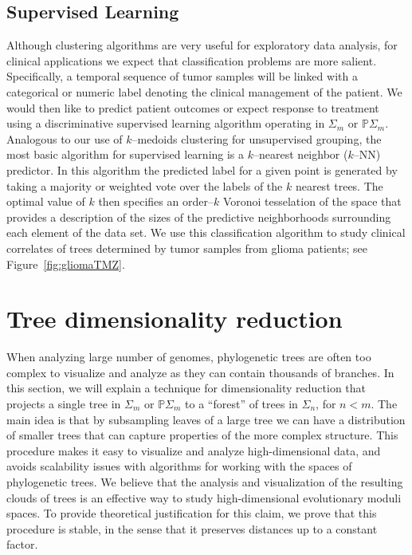 \documentclass[a4paper,11pt]{article}
\begin{document}
\subsection{Supervised Learning}

Although clustering algorithms are very useful for exploratory data analysis, for clinical applications we expect that classification problems are more salient.
Specifically, a temporal sequence of tumor samples will be linked with a categorical or numeric label denoting the clinical management of the patient.
We would then like to predict patient outcomes or expect response to treatment using a discriminative supervised learning algorithm operating in $\Sigma_m$ or $\mathbb{P}\Sigma_m$.
Analogous to our use of $k$--medoids clustering for unsupervised grouping, the most basic algorithm for supervised learning is a $k$--nearest neighbor ($k$--NN) predictor.
In this algorithm the predicted label for a given point is generated by taking a majority or weighted vote over the labels of the $k$ nearest trees.
The optimal value of $k$ then specifies an order--$k$ Voronoi tesselation of the space that provides a description of the sizes of the predictive neighborhoods surrounding each element of the data set.
We use this classification algorithm to study clinical correlates of trees determined by tumor samples from glioma patients; see Figure~\ref{fig:gliomaTMZ}.


\section{Tree dimensionality reduction}\label{sec:treedimred}

When analyzing large number of genomes, phylogenetic trees are often too complex to visualize and analyze as they can contain thousands of branches.
In this section, we will explain a technique for dimensionality reduction that projects a single tree in $\Sigma_m$ or $\mathbb{P}\Sigma_m$ to a ``forest'' of trees in $\Sigma_{n}$, for $n < m$.
The main idea is that by subsampling leaves of a large tree we can have a distribution of smaller trees that can capture properties of the more complex structure.
This procedure makes it easy to visualize and analyze high-dimensional data, and avoids scalability issues with algorithms for working with the spaces of phylogenetic trees.
We believe that the analysis and visualization of the resulting clouds of trees is an effective way to study high-dimensional evolutionary moduli spaces.
To provide theoretical justification for this claim, we prove that this procedure is stable, in the sense that it preserves distances up to a constant factor.
\end{document}
